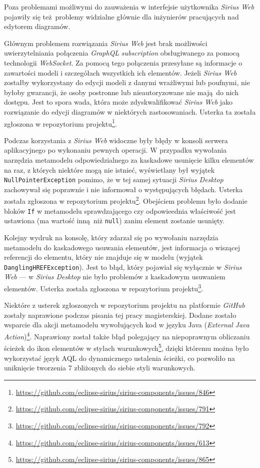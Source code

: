 Poza problemami możliwymi do zauważenia w interfejsie użytkownika \emph{Sirius
	Web} pojawiły się też problemy widzialne głównie dla inżynierów
pracujących nad edytorem diagramów.

Głównym problemem rozwiązania \emph{Sirius Web} jest brak możliwości
uwierzytelniania połączenia \emph{GraphQL} \emph{subscription} obsługiwanego za
pomocą technologii \emph{WebSocket}. Za pomocą tego połączenia przesyłane są
informacje o zawartości modeli i szczegółach wszystkich ich elementów. Jeżeli
\emph{Sirius Web} zostałby wykorzystany do edycji modeli z danymi wrażliwymi
lub poufnymi, nie byłoby gwarancji, że osoby postronne lub nieautoryzowane nie
mają do nich dostępu. Jest to spora wada, która może zdyskwalifikować
\emph{Sirius Web} jako rozwiązanie do edycji diagramów w niektórych
zastosowaniach. Usterka ta została zgłoszona w repozytorium
projektu\footnote{
	\url{https://github.com/eclipse-sirius/sirius-components/issues/846}}.

Podczas korzystania z \emph{Sirius Web} widoczne były błędy w konsoli serwera
aplikacyjnego po wykonaniu pewnych operacji. W przypadku wywołania narzędzia
metamodelu odpowiedzialnego za kaskadowe usunięcie kilku elementów na raz, z
których niektóre mogą nie istnieć, wyświetlany był wyjątek
\texttt{NullPointerException} pomimo, że w tej samej sytuacji \emph{Sirius
	Desktop} zachowywał się poprawnie i nie informował o występujących
błędach.
Usterka została zgłoszona w repozytorium projektu\footnote{
	\url{https://github.com/eclipse-sirius/sirius-components/issues/791}
}. Obejściem problemu było dodanie bloków \texttt{If} w metamodelu
sprawdzającego czy odpowieednia właściwość jest ustawiona (ma wartość inną niż
\texttt{null}) zanim element zostanie usunięty.

Kolejny wydruk na konsolę, który zdarzał się po wywołaniu narzędzia metamodelu
do kaskadowego usuwania elementów, jest informacja o wiszącej referencji do
elementu, który nie znajduje się w modelu (wyjątek
\texttt{DanglingHREFException}). Jest to błąd, który pojawiał się wyłącznie w
\emph{Sirius Web} --- w \emph{Sirius Desktop} nie było problemów z kaskadowym
usuwaniem elementów. Usterka została zgłoszona w repozytorium
projektu\footnote{
	\url{https://github.com/eclipse-sirius/sirius-components/issues/792}
}.

Niektóre z usterek zgłoszonych w repozytorium projektu na platformie
\emph{GitHub} zostały naprawione podczas pisania tej pracy magisterskiej.
Dodane zostało wsparcie dla akcji metamodelu wywołujących kod w języku Java
(\emph{External Java Action})\footnote{
	\url{https://github.com/eclipse-sirius/sirius-components/issues/613}}.
Naprawiony został także błąd polegający na niepoprawnym obliczaniu ścieżek do
ikon elementów w stylach warunkowych\footnote{
	\url{https://github.com/eclipse-sirius/sirius-components/issues/865}
}, dzięki któremu można było wykorzystać język \gls{AQL} do dynamicznego
ustalenia ścieżki, co pozwoliło na uniknięcie tworzenia 7 zbliżonych do
siebie styli warunkowych.

